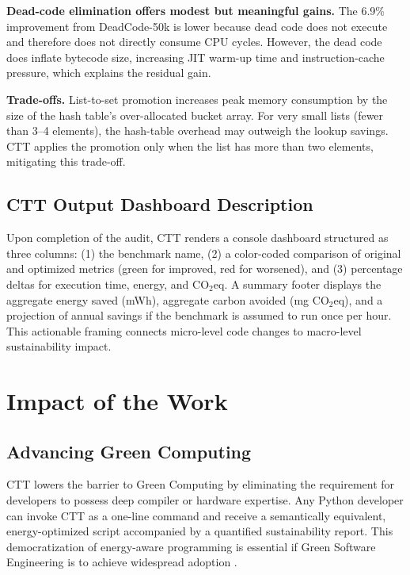 \documentclass[conference]{IEEEtran}
\begin{document}
\textbf{Dead-code elimination offers modest but meaningful gains.}  The
6.9\% improvement from DeadCode-50k is lower because dead code does not
execute and therefore does not directly consume CPU cycles.  However, the
dead code does inflate bytecode size, increasing JIT warm-up time and
instruction-cache pressure, which explains the residual gain.

\textbf{Trade-offs.}  List-to-set promotion increases peak memory consumption
by the size of the hash table's over-allocated bucket array.  For very small
lists (fewer than 3--4 elements), the hash-table overhead may outweigh the
lookup savings.  CTT applies the promotion only when the list has more than
two elements, mitigating this trade-off.

\subsection{CTT Output Dashboard Description}

Upon completion of the audit, CTT renders a console dashboard structured as
three columns: (1) the benchmark name, (2) a color-coded comparison of
original and optimized metrics (green for improved, red for worsened), and
(3) percentage deltas for execution time, energy, and $\mathrm{CO_2eq}$.
A summary footer displays the aggregate energy saved (mWh), aggregate carbon
avoided (mg $\mathrm{CO_2eq}$), and a projection of annual savings if the
benchmark is assumed to run once per hour.  This actionable framing connects
micro-level code changes to macro-level sustainability impact.

\section{Impact of the Work}

\subsection{Advancing Green Computing}
CTT lowers the barrier to Green Computing by eliminating the requirement
for developers to possess deep compiler or hardware expertise.  Any Python
developer can invoke CTT as a one-line command and receive a semantically
equivalent, energy-optimized script accompanied by a quantified sustainability
report.  This democratization of energy-aware programming is essential if
Green Software Engineering is to achieve widespread adoption \cite{ref15}.
\end{document}
